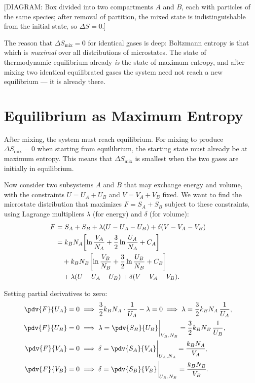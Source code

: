 \begin{center}[DIAGRAM: Box divided into two compartments $A$ and $B$, each with particles of the same species; after removal of partition, the mixed state is indistinguishable from the initial state, so $\Delta S = 0$.]\end{center}

The reason that $\Delta S_{\text{mix}} = 0$ for identical gases is deep: Boltzmann entropy is that which is \emph{maximal} over all distributions of microstates. The state of thermodynamic equilibrium already \emph{is} the state of maximum entropy, and after mixing two identical equilibrated gases the system need not reach a new equilibrium — it is already there.


\section{Equilibrium as Maximum Entropy}

After mixing, the system must reach equilibrium. For mixing to produce $\Delta S_{\text{mix}} = 0$ when starting from equilibrium, the starting state must already be at maximum entropy. This means that $\Delta S_{\text{mix}}$ is smallest when the two gases are initially in equilibrium.

Now consider two subsystems $A$ and $B$ that may exchange energy and volume, with the constraints $U = U_A + U_B$ and $V = V_A + V_B$ fixed. We want to find the microstate distribution that maximizes $F = S_A + S_B$ subject to these constraints, using Lagrange multipliers $\lambda$ (for energy) and $\delta$ (for volume):
\begin{align}
    F &= S_A + S_B + \lambda(U - U_A - U_B) + \delta(V - V_A - V_B) \notag\\
    &= k_B N_A\!\left[\ln\frac{V_A}{N_A} + \frac{3}{2}\ln\frac{U_A}{N_A} + C_A\right] \notag\\
    &\quad + k_B N_B\!\left[\ln\frac{V_B}{N_B} + \frac{3}{2}\ln\frac{U_B}{N_B} + C_B\right] \notag\\
    &\quad + \lambda(U - U_A - U_B) + \delta(V - V_A - V_B).
\end{align}

Setting partial derivatives to zero:
\begin{align}
    \pdv{F}{U_A} = 0 &\implies \frac{3}{2}k_B N_A\cdot\frac{1}{U_A} - \lambda = 0 \implies \lambda = \frac{3}{2}k_B N_A\,\frac{1}{U_A},\\
    \pdv{F}{U_B} = 0 &\implies \lambda = \pdv{S_B}{U_B}\bigg|_{V_B,N_B} = \frac{3}{2}k_B N_B\,\frac{1}{U_B},\\
    \pdv{F}{V_A} = 0 &\implies \delta = \pdv{S_A}{V_A}\bigg|_{U_A,N_A} = \frac{k_B N_A}{V_A},\\
    \pdv{F}{V_B} = 0 &\implies \delta = \pdv{S_B}{V_B}\bigg|_{U_B,N_B} = \frac{k_B N_B}{V_B}.
\end{align}


